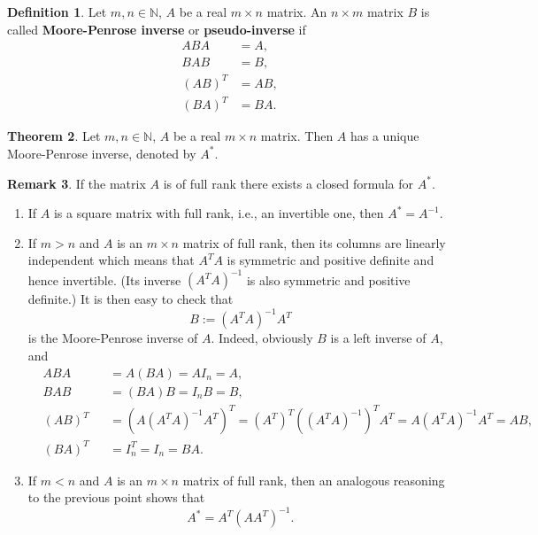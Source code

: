 \documentclass[fleqn]{article}
\theoremstyle{definition}
\newtheorem{theorem}{Theorem}[section]
\newtheorem{definition}[theorem]{Definition}
\newtheorem{remark}[theorem]{Remark}
\newcommand{\N}{\mathbb{N}}
\begin{document}
\begin{definition}
  Let $m, n \in \N$, $A$ be a real $m \times n$ matrix.
  An $n \times m$ matrix $B$ is called \textbf{Moore-Penrose inverse} or
  \textbf{pseudo-inverse} if
  \begin{subequations}
    \begin{align}
      A B A & = A, \\
      B A B & = B, \\
      (A B)^T & = A B, \\
      (B A)^T & = B A.
    \end{align}
  \end{subequations}
\end{definition}

\begin{theorem}
  Let $m, n \in \N$, $A$ be a real $m \times n$ matrix.
  Then $A$ has a unique Moore-Penrose inverse, denoted by $A^*$.
\end{theorem}

\begin{remark}
  If the matrix $A$ is of full rank there exists a closed formula for $A^*$.
  \begin{enumerate}
    \item
      If $A$ is a square matrix with full rank, i.e., an invertible one, then
      $A^* = A^{-1}$.
    \item
      If $m > n$ and $A$ is an $m \times n$ matrix of full rank, then its
      columns are linearly independent which means that $A^T A$ is
      symmetric and positive definite and hence invertible.
      (Its inverse $(A^T A)^{-1}$ is also symmetric and positive definite.)
      It is then easy to check that
      \begin{equation}
        B := (A^T A)^{-1} A^T
      \end{equation}
      is the Moore-Penrose inverse of $A$.
      Indeed, obviously $B$ is a left inverse of $A$, and
      \begin{subequations}
        \begin{alignat}{2}
          & A B A && = A (B A) = A I_n = A, \\
          & B A B && = (B A) B = I_n B = B, \\
          & (A B)^T && = (A (A^T A)^{-1} A^T)^T
            = (A^T)^T ((A^T A)^{-1})^T A^T = A (A^T A)^{-1} A^T = A B, \\
          & (B A)^T && = I_n^T = I_n = B A.
        \end{alignat}
      \end{subequations}
    \item
      If $m < n$ and $A$ is an $m \times n$ matrix of full rank, then an
      analogous reasoning to the previous point shows that
      \begin{equation}
        A^* = A^T (A A^T)^{-1}.
      \end{equation}
  \end{enumerate}
\end{remark}
\end{document}
